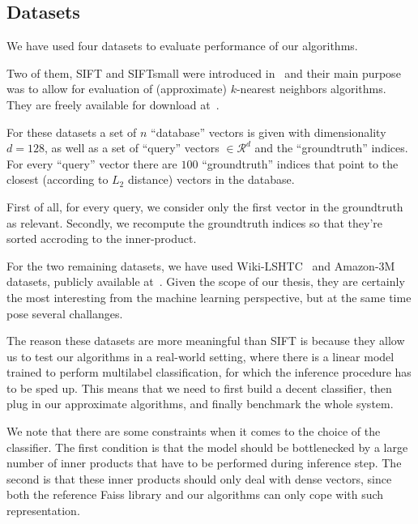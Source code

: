     \subsection{Datasets}\label{subsec:datasets}

        We have used four datasets to evaluate performance of our algorithms.

        Two of them, SIFT and SIFTsmall were introduced in~\cite{jegou2011product} and their
        main purpose was to allow for evaluation of (approximate) $k$-nearest neighbors algorithms. They are freely
        available for download at~\cite{sift}.

        For these datasets a set of $n$ ``database'' vectors is given with dimensionality
        $d=128$, as well as a set of ``query'' vectors $\in \mathcal{R}^d$
        and the ``groundtruth'' indices. For every ``query'' vector there are $100$ ``groundtruth'' indices
        that point to the closest (according to $L_2$ distance) vectors in the database.

        First of all, for every query, we consider only the first vector in the groundtruth as relevant.
        Secondly, we recompute the groundtruth indices so that they're sorted accroding to the inner-product.

        For the two remaining datasets, we have used Wiki-LSHTC~\cite{lshtc} and
        Amazon-3M~\cite{a3m} datasets, publicly available at~\cite{exrepo}.
        Given the scope of our thesis, they are certainly the most interesting from the machine learning perspective,
        but at the same time pose several challanges.

        The reason these datasets are more meaningful than SIFT is because they allow us to test our
        algorithms in a real-world setting, where there is a linear model trained to perform multilabel
        classification, for which the inference procedure has to be sped up.
        This means that we need to first build a decent classifier, then plug in our approximate algorithms,
        and finally benchmark the whole system.

        We note that there are some constraints when it comes to the choice of the classifier. The first condition
        is that the model should be bottlenecked by a large number of inner products that have to be performed during
        inference step. The second is that these inner products should only deal with dense vectors, since both the reference Faiss library and our algorithms can only cope with such representation.

